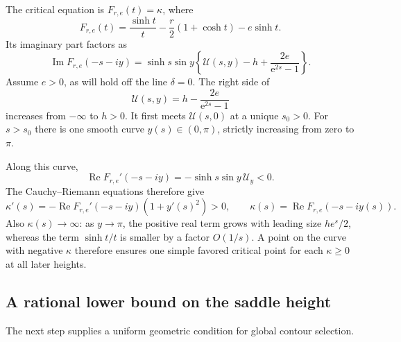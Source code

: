 \documentclass[11pt,a4paper]{article}
\numberwithin{equation}{section}
\begin{document}
The critical equation is $F_{r,e}(t)=\kappa$, where
\[
 F_{r,e}(t)=\frac{\sinh t}{t}-\frac r2(1+\cosh t)-e\sinh t.
\]
Its imaginary part factors as
\begin{equation}\label{aud:gh:imaginary}
 \operatorname{Im}F_{r,e}(-s-iy)
 =\sinh s\sin y\left\{\mathcal U(s,y)-h+\frac{2e}{\mathrm e^{2s}-1}\right\}.
\end{equation}
Assume $e>0$, as will hold off the line $\delta=0$. The right side of
\begin{equation}\label{aud:gh:heightcurve}
 \mathcal U(s,y)=h-\frac{2e}{\mathrm e^{2s}-1}
\end{equation}
increases from $-\infty$ to $h>0$. It first meets $\mathcal U(s,0)$ at a unique $s_0>0$. For $s>s_0$ there is one smooth curve $y(s)\in(0,\pi)$, strictly increasing from zero to $\pi$.

Along this curve,
\[
 \operatorname{Re}F_{r,e}'(-s-iy)=-\sinh s\sin y\,\mathcal U_y<0.
\]
The Cauchy--Riemann equations therefore give
\begin{equation}\label{aud:gh:CR}
 \kappa'(s)=-\operatorname{Re}F_{r,e}'(-s-iy)(1+y'(s)^2)>0,
 \qquad \kappa(s)=\operatorname{Re}F_{r,e}(-s-iy(s)).
\end{equation}
Also $\kappa(s)\to\infty$: as $y\to\pi$, the positive real term grows with leading size $he^s/2$, whereas the term $\sinh t/t$ is smaller by a factor $O(1/s)$. A point on the curve with negative $\kappa$ therefore ensures one simple favored critical point for each $\kappa\ge0$ at all later heights.

\subsection{A rational lower bound on the saddle height}
The next step supplies a uniform geometric condition for global contour selection.
\end{document}
